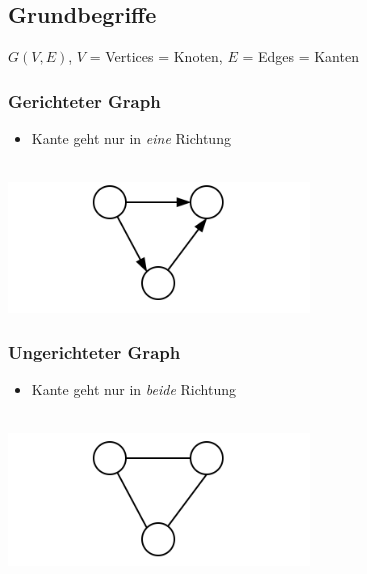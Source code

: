 \subsection{Grundbegriffe}

$G(V,E)$, $V$ = Vertices = Knoten, $E$ = Edges = Kanten

\begin{minipage}{0.5\textwidth}
\subsubsection*{Gerichteter Graph}
\begin{itemize}[leftmargin=*]
\item Kante geht nur in \textit{eine} Richtung
\end{itemize}\
\\
\includegraphics[width=0.6\textwidth]{graphics/graph_gerichtet.png}
\end{minipage}
\hfill
\begin{minipage}{0.5\textwidth}
\subsubsection*{Ungerichteter Graph}
\begin{itemize}[leftmargin=*]
\item Kante geht nur in \textit{beide} Richtung
\end{itemize}\
\\
\includegraphics[width=0.6\textwidth]{graphics/graph_ungerichtet.png}
\end{minipage}


